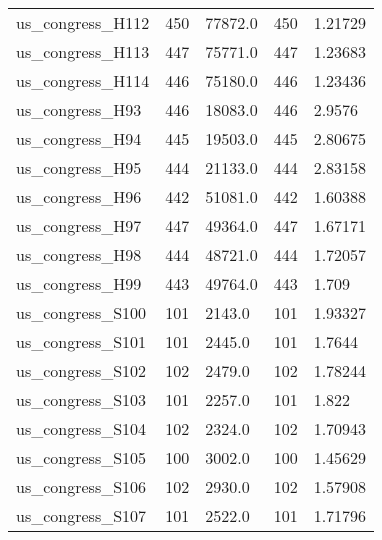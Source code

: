 \begin{longtable}{lllll}
 us\_congress\_H112                                   & 450        & 77872.0     & 450   & 1.21729    \\
 us\_congress\_H113                                   & 447        & 75771.0     & 447   & 1.23683    \\
 us\_congress\_H114                                   & 446        & 75180.0     & 446   & 1.23436    \\
 us\_congress\_H93                                    & 446        & 18083.0     & 446   & 2.9576     \\
 us\_congress\_H94                                    & 445        & 19503.0     & 445   & 2.80675    \\
 us\_congress\_H95                                    & 444        & 21133.0     & 444   & 2.83158    \\
 us\_congress\_H96                                    & 442        & 51081.0     & 442   & 1.60388    \\
 us\_congress\_H97                                    & 447        & 49364.0     & 447   & 1.67171    \\
 us\_congress\_H98                                    & 444        & 48721.0     & 444   & 1.72057    \\
 us\_congress\_H99                                    & 443        & 49764.0     & 443   & 1.709      \\
 us\_congress\_S100                                   & 101        & 2143.0      & 101   & 1.93327    \\
 us\_congress\_S101                                   & 101        & 2445.0      & 101   & 1.7644     \\
 us\_congress\_S102                                   & 102        & 2479.0      & 102   & 1.78244    \\
 us\_congress\_S103                                   & 101        & 2257.0      & 101   & 1.822      \\
 us\_congress\_S104                                   & 102        & 2324.0      & 102   & 1.70943    \\
 us\_congress\_S105                                   & 100        & 3002.0      & 100   & 1.45629    \\
 us\_congress\_S106                                   & 102        & 2930.0      & 102   & 1.57908    \\
 us\_congress\_S107                                   & 101        & 2522.0      & 101   & 1.71796    \\

\end{longtable}
